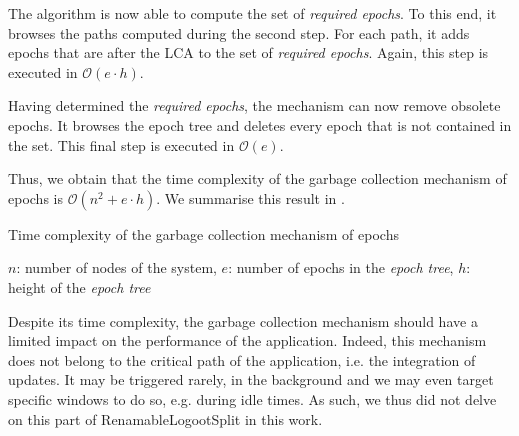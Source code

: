 \documentclass[10pt,journal,compsoc]{IEEEtran}
\let\MYoriglatexcaption\caption
\renewcommand{\caption}[2][\relax]{\MYoriglatexcaption[#2]{#2}}
\newcommand{\eg}{e.g. }
\newcommand{\ie}{i.e. }
\newcommand{\bigO}[1]{$\mathcal{O}(#1)$}
\begin{document}
The algorithm is now able to compute the set of \emph{required epochs}.
To this end, it browses the paths computed during the second step.
For each path, it adds epochs that are after the \ac{LCA} to the set of \emph{required epochs}.
Again, this step is executed in \bigO{e \cdot h}.

Having determined the \emph{required epochs}, the mechanism can now remove obsolete epochs.
It browses the epoch tree and deletes every epoch that is not contained in the set.
This final step is executed in \bigO{e}.

Thus, we obtain that the time complexity of the garbage collection mechanism of epochs is \bigO{n^2 + e \cdot h}.
We summarise this result in .

\begin{table}[!ht]
    \centering
    \caption{Time complexity of the garbage collection mechanism of epochs}
    \label{tab:time-complexity-gc-mechanism-epochs}
    \caption*{$n$: number of nodes of the system, $e$: number of epochs in the \emph{epoch tree}, $h$: height of the \emph{epoch tree}}
\end{table}

Despite its time complexity, the garbage collection mechanism should have a limited impact on the performance of the application.
Indeed, this mechanism does not belong to the critical path of the application, \ie the integration of updates.
It may be triggered rarely, in the background and we may even target specific windows to do so, \eg during idle times.
As such, we thus did not delve on this part of RenamableLogootSplit in this work.
\end{document}
